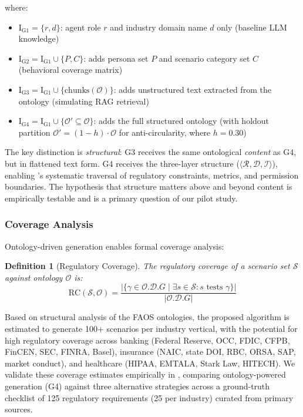 \documentclass[11pt,a4paper]{article}
\newtheorem{definition}{Definition}[section]
\newcommand{\faos}{\textsc{FAOS}}
\newcommand{\scenario}{\mathcal{S}}
\newcommand{\onto}{\mathcal{O}}
\begin{document}
\noindent where:
\begin{itemize}
  \item $\text{I}_{\text{G1}} = \{r, d\}$: agent role $r$ and
    industry domain name $d$ only (baseline LLM knowledge)
  \item $\text{I}_{\text{G2}} = \text{I}_{\text{G1}} \cup \{P, C\}$:
    adds persona set $P$ and scenario category set $C$
    (behavioral coverage matrix)
  \item $\text{I}_{\text{G3}} = \text{I}_{\text{G1}} \cup
    \{\text{chunks}(\onto)\}$: adds unstructured text extracted from
    the ontology (simulating RAG retrieval)
  \item $\text{I}_{\text{G4}} = \text{I}_{\text{G1}} \cup
    \{\onto' \subseteq \onto\}$: adds the full structured ontology
    (with holdout partition $\onto' = (1 - h) \cdot \onto$ for
    anti-circularity, where $h = 0.30$)
\end{itemize}

\noindent The key distinction is \emph{structural}: G3 receives the
same ontological \emph{content} as G4, but in flattened text form.
G4 receives the three-layer structure ($\langle \mathcal{R},
\mathcal{D}, \mathcal{I} \rangle$), enabling 's
systematic traversal of regulatory constraints, metrics, and
permission boundaries. The hypothesis that structure matters above
and beyond content is empirically testable and is a primary question
of our pilot study.

\subsubsection{Coverage Analysis}

Ontology-driven generation enables formal coverage analysis:

\begin{definition}[Regulatory Coverage]
  The regulatory coverage of a scenario set $\scenario$ against
  ontology $\onto$ is:
  \begin{equation}
    \text{RC}(\scenario, \onto) = \frac{|\{\gamma \in \onto.\mathcal{D}.G
      \mid \exists s \in \scenario: s \text{ tests } \gamma\}|}{
      |\onto.\mathcal{D}.G|}
  \end{equation}
\end{definition}

Based on structural analysis of the \faos{} ontologies, the proposed
algorithm is estimated to generate 100+ scenarios per industry
vertical, with the potential for high regulatory coverage across
banking (Federal Reserve, OCC, FDIC, CFPB, FinCEN, SEC, FINRA,
Basel), insurance (NAIC, state DOI, RBC, ORSA, SAP, market conduct),
and healthcare (HIPAA, EMTALA, Stark Law, HITECH). We validate
these coverage estimates empirically in ,
comparing ontology-powered generation (G4) against three alternative
strategies across a ground-truth checklist of 125 regulatory
requirements (25 per industry) curated from primary sources.
\end{document}
